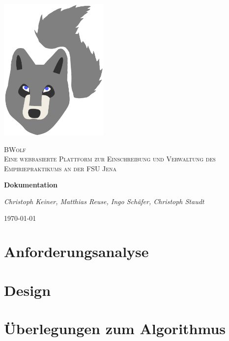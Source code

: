 \documentclass[12pt,a4paper]{report}
\begin{document}
    \onehalfspacing
    
    \begin{titlepage}
        \centering
        \includegraphics[width=0.4\textwidth]{../LogoSoFar.png}\par\vspace{1cm}
        {\scshape \LARGE BWolf \\ \Large Eine webbasierte Plattform zur
            Einschreibung und Verwaltung des
            Empiriepraktikums an der FSU Jena\par}
        \vspace{1.5cm}
        {\huge\bfseries Dokumentation\par}
        \vspace{1.5cm}
        {\large\itshape Christoph Keiner, Matthias Reuse, Ingo Schäfer, Christoph Staudt\par}
        \vspace{1.0cm}
        {\large \today\par}
    \end{titlepage}

    \tableofcontents 
    \clearpage
    
    \chapter{Anforderungsanalyse}
    
    \chapter{Design}
    
    \chapter{Überlegungen zum Algorithmus}
    
    
    
    
\end{document}
